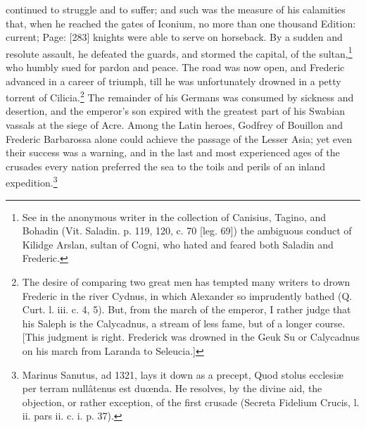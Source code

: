 continued to struggle and to suffer; and such was the measure of his calamities that, when he reached the gates of Iconium, no more than one thousand Edition: current; Page: [283] knights were able to serve on horseback. By a sudden and resolute assault, he defeated the guards, and stormed the capital, of the sultan,\footnote{See in the anonymous writer in the collection of Canisius, Tagino, and Bohadin (Vit. Saladin. p. 119, 120, c. 70 [leg. 69]) the ambiguous conduct of Kilidge Arslan, sultan of Cogni, who hated and feared both Saladin and Frederic.} who humbly sued for pardon and peace. The road was now open, and Frederic advanced in a career of triumph, till he was unfortunately drowned in a petty torrent of Cilicia.\footnote{The desire of comparing two great men has tempted many writers to drown Frederic in the river Cydnus, in which Alexander so imprudently bathed (Q. Curt. l. iii. c. 4, 5). But, from the march of the emperor, I rather judge that his Saleph is the Calycadnus, a stream of less fame, but of a longer course. [This judgment is right. Frederick was drowned in the Geuk Su or Calycadnus on his march from Laranda to Seleucia.]} The remainder of his Germans was consumed by sickness and desertion, and the emperor\texthebrew{}’s son expired with the greatest part of his Swabian vassals at the siege of Acre. Among the Latin heroes, Godfrey of Bouillon and Frederic Barbarossa alone could achieve the passage of the Lesser Asia; yet even their success was a warning, and in the last and most experienced ages of the crusades every nation preferred the sea to the toils and perils of an inland expedition.\footnote{Marinus Sanutus, ad 1321, lays it down as a precept, Quod stolus ecclesiæ per terram nullâtenus est duœnda. He resolves, by the divine aid, the objection, or rather exception, of the first crusade (Secreta Fidelium Crucis, l. ii. pars ii. c. i. p. 37).}

